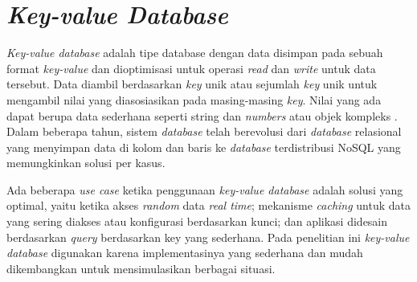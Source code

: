 \section{\textit{Key-value Database}}

\textit{Key-value database} adalah tipe database dengan data disimpan pada sebuah format \textit{key-value} dan dioptimisasi untuk operasi \textit{read} dan \textit{write} untuk data tersebut. Data diambil berdasarkan \textit{key} unik atau sejumlah \textit{key} unik untuk mengambil nilai yang diasosiasikan pada masing-masing \textit{key}. Nilai yang ada dapat berupa data sederhana seperti string dan \textit{numbers} atau objek kompleks \parencite{mongo2024keyvalue}. Dalam beberapa tahun, sistem \textit{database} telah berevolusi dari \textit{database} relasional yang menyimpan data di kolom dan baris ke \textit{database} terdistribusi NoSQL yang memungkinkan solusi per kasus.

Ada beberapa \textit{use case} ketika penggunaan \textit{key-value database} adalah solusi yang optimal, yaitu ketika akses \textit{random} data \textit{real time}; mekanisme \textit{caching} untuk data yang sering diakses atau konfigurasi berdasarkan kunci; dan aplikasi didesain berdasarkan \textit{query} berdasarkan key yang sederhana. Pada penelitian ini \textit{key-value database} digunakan karena implementasinya yang sederhana dan mudah dikembangkan untuk mensimulasikan berbagai situasi.

% 
% 
